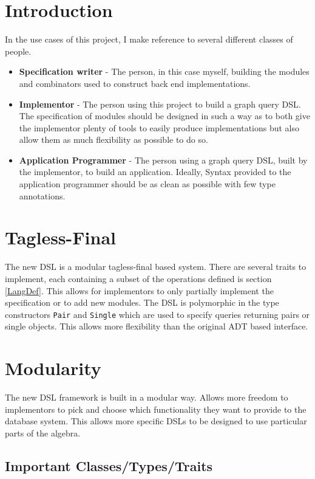 \documentclass{report}
\newcommand \2[0]{\textbf{2}}
\newcommand \3[0]{\textbf{3}}
\begin{document}
\section{Introduction}
In the use cases of this project, I make reference to several different classes of people.

\begin{itemize}
    \item \textbf{Specification writer} - The person, in this case myself, building the modules and combinators used to construct back end implementations.
    \item \textbf{Implementor} - The person using this project to build a graph query DSL. The specification of modules should be designed in such a way as to both give the implementor plenty of tools to easily produce implementations but also allow them as much flexibility as possible to do so.
    \item \textbf{Application Programmer} - The person using a graph query DSL, built by the implementor, to build an application. Ideally, Syntax provided to the application programmer should be as clean as possible with few type annotations.

\end{itemize}
 
\section{Tagless-Final}
The new DSL is a modular tagless-final based system. There are several traits to implement, each containing a subset of the operations defined is section \ref{LangDef}. This allows for implementors to only partially implement the specification or to add new modules.
The DSL is polymorphic in the type constructors \texttt{Pair} and \texttt{Single} which are used to specify queries returning pairs or single objects. This allows more flexibility than the original ADT based interface.

\section{Modularity}
The new DSL framework is built in a modular way. 
Allows more freedom to implementors to pick and choose which functionality they want to provide to the database system. This allows more specific DSLs to be designed to use particular parts of the algebra.
\subsection{Important Classes/Types/Traits}
\end{document}
